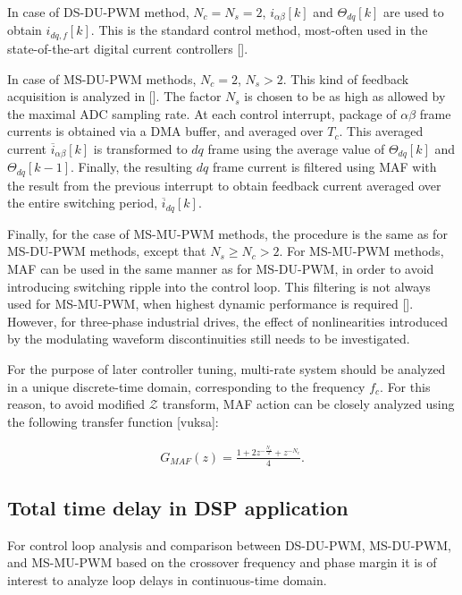 \documentclass[journal]{IEEEtran}
\begin{document}
In case of DS-DU-PWM method, $N_c = N_s = 2$, $i_{\alpha \beta}[k]$ and $\Theta_{dq}[k]$ are used to obtain $i_{dq,f}[k]$. This is the standard control method, most-often used in the state-of-the-art digital current controllers []. 

In case of MS-DU-PWM methods, $N_c = 2$, $N_s>2$. This kind of feedback acquisition is analyzed in []. The factor $N_s$ is chosen to be as high as allowed by the maximal ADC sampling rate. At each control interrupt, package of $\alpha \beta$ frame currents is obtained via a DMA buffer, and averaged over $T_c$. This averaged current $\overline{i}_{\alpha \beta}[k]$ is transformed to $dq$ frame using the average value of $\Theta_{dq}[k]$ and $\Theta_{dq}[k-1]$. Finally, the resulting $dq$ frame current is filtered using MAF with the result from the previous interrupt to obtain feedback current averaged over the entire switching period, $\overline{i}_{dq}[k]$. 

Finally, for the case of MS-MU-PWM methods, the procedure is the same as for MS-DU-PWM methods, except that $N_s \geq N_c > 2$. For MS-MU-PWM methods, MAF can be used in the same manner as for MS-DU-PWM, in order to avoid introducing switching ripple into the control loop. This filtering is not always used for MS-MU-PWM, when highest dynamic performance is required []. However, for three-phase industrial drives, the effect of nonlinearities introduced by the modulating waveform discontinuities still needs to be investigated. 

For the purpose of later controller tuning, multi-rate system should be analyzed in a unique discrete-time domain, corresponding to the frequency $f_c$. For this reason, to avoid modified $\mathcal{Z}$ transform, MAF action can be closely analyzed using the following transfer function [vuksa]:

\begin{equation}
\begin{aligned}
G_{MAF}(z) = \frac{1 + 2z^{-\frac{N_c}{2}} + z^{-N_c}}{4}.
\label{eq:MAF} 
\end{aligned}    
\end{equation}


\subsection{Total time delay in DSP application}

For control loop analysis and comparison between DS-DU-PWM, MS-DU-PWM, and MS-MU-PWM based on the crossover frequency and phase margin it is of interest to analyze loop delays in continuous-time domain.
\end{document}
